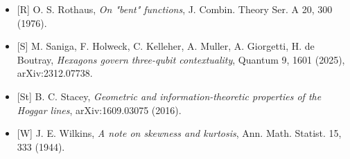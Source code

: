 \documentclass[11pt,a4paper]{article}
\begin{document}
\begin{itemize}
  {[}O{]} M. Okumura, \emph{Hypersurfaces and a pinching problem on the second fundamental tensor}, Amer. J. Math. 96, 207 (1974).
\item
  {[}R{]} O. S. Rothaus, \emph{On "bent" functions}, J. Combin. Theory Ser. A 20, 300 (1976).
\item
  {[}S{]} M. Saniga, F. Holweck, C. Kelleher, A. Muller, A. Giorgetti, H. de Boutray, \emph{Hexagons govern three-qubit contextuality}, Quantum 9, 1601 (2025), arXiv:2312.07738.
\item
  {[}St{]} B. C. Stacey, \emph{Geometric and information-theoretic properties of the Hoggar lines}, arXiv:1609.03075 (2016).
\item
  {[}W{]} J. E. Wilkins, \emph{A note on skewness and kurtosis}, Ann. Math. Statist. 15, 333 (1944).
\end{itemize}
\end{document}
